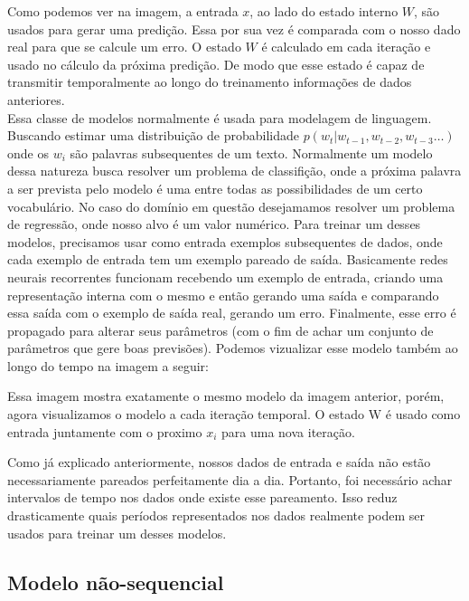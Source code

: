 \documentclass[a4paper]{article}
\begin{document}


Como podemos ver na imagem, a entrada $x$, ao lado do estado interno $W$, são usados para gerar uma predição. Essa por sua vez é comparada com o nosso dado real para que se calcule um erro. O estado $W$ é calculado em cada iteração e usado no cálculo da próxima predição. De modo que esse estado é capaz de transmitir temporalmente ao longo do treinamento informações de dados anteriores.
\\

Essa classe de modelos normalmente é usada para modelagem de linguagem. Buscando estimar uma distribuição de probabilidade $p(w_t | w_{t-1},w_{t-2},w_{t-3} \dots ) $ onde os $w_i$ são palavras subsequentes de um texto. Normalmente um modelo dessa natureza busca resolver um problema de classifição, onde a próxima palavra a ser prevista pelo modelo é uma entre todas as possibilidades de um certo vocabulário. No caso do domínio em questão desejamamos resolver um problema de regressão, onde nosso alvo é um valor numérico. Para treinar um desses modelos, precisamos usar como entrada exemplos subsequentes de dados, onde cada exemplo de entrada tem um exemplo pareado de saída. Basicamente redes neurais recorrentes funcionam recebendo um exemplo de entrada, criando uma representação interna com o mesmo e então gerando uma saída e comparando essa saída com o exemplo de saída real, gerando um erro. Finalmente, esse erro é propagado para alterar seus parâmetros (com o fim de achar um conjunto de parâmetros que gere boas previsões). Podemos vizualizar esse modelo também ao longo do tempo na imagem a seguir:





Essa imagem mostra exatamente o mesmo modelo da imagem anterior, porém, agora visualizamos o modelo a cada iteração temporal. O estado W é usado como entrada juntamente com o proximo $x_i$ para uma nova iteração.

\bigskip

Como já explicado anteriormente, nossos dados de entrada e saída não estão necessariamente pareados perfeitamente dia a dia. Portanto, foi necessário achar intervalos de tempo nos dados onde existe esse pareamento. Isso reduz drasticamente quais períodos representados nos dados realmente podem ser usados para treinar um desses modelos.



\subsection{Modelo não-sequencial}
\end{document}
